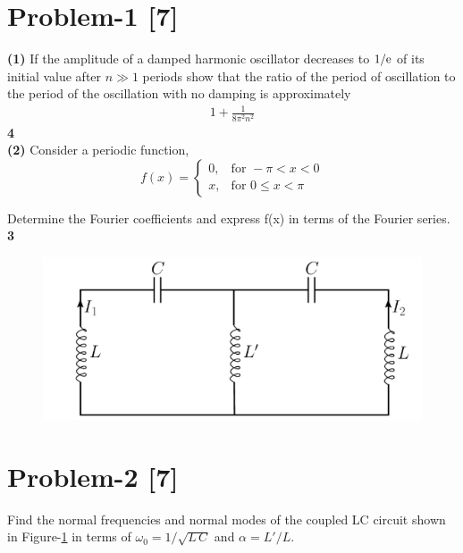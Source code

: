 \documentclass[12pt, a4paper]{article}
\begin{document}
\section*{Problem-1 \hfill \textbf{[7]}}
\noindent
\textbf{(1)} If the amplitude of a damped harmonic oscillator decreases to $1/{\rm e}$ of its 
initial value after $n\gg 1$ periods show that the ratio of the period of oscillation to the period
 of the oscillation with no damping is approximately
\begin{align*}
    1 + \frac{1}{8\pi^{2}n^{2}}
\end{align*}\hfill\textbf{4}\\

\noindent
\textbf{(2)} Consider a periodic function,
\[ f(x) =
\begin{cases} 
0, & \text{for } -\pi< x < 0 \\
x, & \text{for } 0\leq x <\pi
\end{cases}
\] 

Determine the Fourier coefficients and express f(x) in terms of the Fourier series.
\hfill\textbf{3}\\


\begin{figure}[h]
    \centering
    \includegraphics[scale=0.4]{figs/LC-coupled.png}
    \caption{}
    \label{fig:LC-coupled}
\end{figure}
\section*{Problem-2 \hfill \textbf{[7]}}
Find the normal frequencies and normal modes of the coupled LC circuit shown in 
Figure-\ref{fig:LC-coupled} in terms of $\omega_0=1/\sqrt{L\,C}$ and $\alpha=L'/L$.



\end{document}

